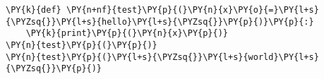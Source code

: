 \begin{Verbatim}[commandchars=\\\{\}]
\PY{k}{def} \PY{n+nf}{test}\PY{p}{(}\PY{n}{x}\PY{o}{=}\PY{l+s}{\PYZsq{}}\PY{l+s}{hello}\PY{l+s}{\PYZsq{}}\PY{p}{)}\PY{p}{:}
    \PY{k}{print}\PY{p}{(}\PY{n}{x}\PY{p}{)}
\PY{n}{test}\PY{p}{(}\PY{p}{)}
\PY{n}{test}\PY{p}{(}\PY{l+s}{\PYZsq{}}\PY{l+s}{world}\PY{l+s}{\PYZsq{}}\PY{p}{)}
\end{Verbatim}
